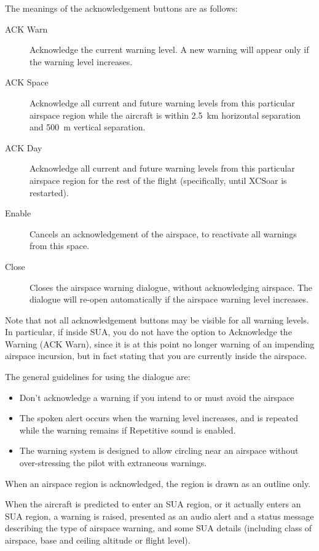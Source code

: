 The meanings of the acknowledgement buttons are as follows:
\begin{description}
\item[ACK Warn]  Acknowledge the current warning level.  A new warning will appear
only if the warning level increases.
\item[ACK Space]  Acknowledge all current and future warning levels from this 
particular airspace region while the aircraft is within 2.5~km horizontal separation
and 500~m vertical separation.
\item[ACK Day]  Acknowledge all current and future warning levels from this particular
airspace region for the rest of the flight (specifically, until XCSoar
is restarted).
\item[Enable]  Cancels an acknowledgement of the airspace, to reactivate all warnings
from this space.
\item[Close] Closes the airspace warning dialogue, without acknowledging airspace.
  The dialogue will re-open automatically if the airspace warning level increases.
\end{description}

Note that not all acknowledgement buttons may be visible for all
warning levels.  In particular, if inside SUA, you do not have the
option to Acknowledge the Warning (ACK Warn), since it is at this
point no longer warning of an impending airspace incursion, but in
fact stating that you are currently inside the airspace.

The general guidelines for using the dialogue are:
\begin{itemize}
\item  Don't acknowledge a warning if you intend to or must avoid the airspace
\item  The spoken alert occurs when the warning level increases, and is
  repeated while the warning remains if Repetitive sound is enabled.
\item  The warning system is designed to allow circling near an airspace without
  over-stressing the pilot with extraneous warnings.
\end{itemize}

When an airspace region is acknowledged, the region is drawn as an
outline only.

When the aircraft is predicted to enter an SUA region, or it actually
enters an SUA region, a warning is raised, presented as an audio alert
and a status message describing the type of airspace warning, and some SUA
details (including class of airspace, base and ceiling altitude or
flight level).

